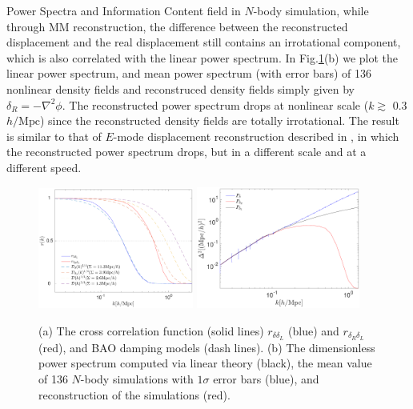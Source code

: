 \begin{section}{Power Spectra and Information Content}
field in $N$-body simulation, while through MM reconstruction, the difference 
between the reconstructed displacement and the real displacement still contains 
an irrotational component, which is also correlated with the linear power spectrum.
In Fig.\ref{fig:cp}(b) we plot the linear power spectrum, and mean power spectrum 
(with error bars) of 136 nonlinear density fields and reconstruced density fields 
simply given by $\delta_R=-\nabla^2\phi$. 
The reconstructed power spectrum drops at nonlinear scale ($k \gtrsim$ 0.3 $h/\mathrm{Mpc}$) 
since the reconstructed density fields are totally irrotational. 
The result is similar to that of $E$-mode displacement reconstruction 
described in \cite{bib:Yu2016}, in which the reconstructed power spectrum 
drops, but in a different scale and at a different speed.
\begin{figure}
\centering
\includegraphics[width=0.455\textwidth]{fig2a.pdf} 
\includegraphics[width=0.48\textwidth]{fig2b.pdf}
\caption{(a) The cross correlation function (solid lines) $r_{\delta\delta_L}$ (blue) 
and $r_{\delta_R\delta_L}$ (red), and BAO damping models (dash lines). 
(b) The dimensionless power spectrum computed via linear theory (black), 
the mean value of 136 $N$-body simulations with $1\sigma$ error bars (blue), 
and reconstruction of the simulations (red).}
\label{fig:cp}
\end{figure}


\end{section}
